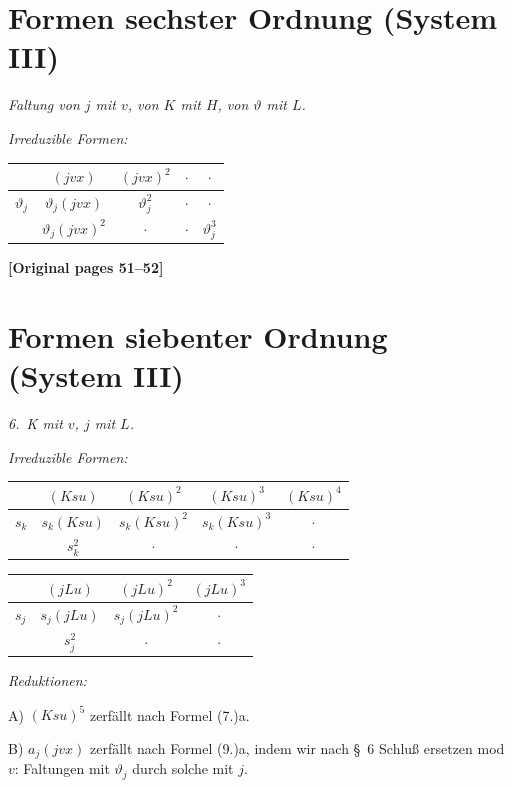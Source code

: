 \documentclass[12pt,a4paper]{article}
\begin{document}
\section{Formen sechster Ordnung (System III)}

\textit{Faltung von $j$ mit $v$, von $K$ mit $H$, von $\vartheta$ mit $L$.}

\textit{Irreduzible Formen:}
\begin{center}
\begin{tabular}{c|cccc}
& $(jvx)$ & $(jvx)^2$ & $\cdot$ & $\cdot$ \\
\hline
$\vartheta_j$ & $\vartheta_j (jvx)$ & $\vartheta_j^2$ & $\cdot$ & $\cdot$ \\
& $\vartheta_j (jvx)^2$ & $\cdot$ & $\cdot$ & $\vartheta_j^3$
\end{tabular}
\end{center}

\noindent\textbf{[Original pages 51--52]}

\section{Formen siebenter Ordnung (System III)}

\textit{6.\ K mit $v$, $j$ mit $L$.}

\textit{Irreduzible Formen:}
\begin{center}
\begin{tabular}{c|cccc}
& $(Ksu)$ & $(Ksu)^2$ & $(Ksu)^3$ & $(Ksu)^4$ \\
\hline
$s_k$ & $s_k(Ksu)$ & $s_k(Ksu)^2$ & $s_k(Ksu)^3$ & $\cdot$ \\
& $s_k^2$ & $\cdot$ & $\cdot$ & $\cdot$
\end{tabular}
\end{center}

\begin{center}
\begin{tabular}{c|ccc}
& $(jLu)$ & $(jLu)^2$ & $(jLu)^3$ \\
\hline
$s_j$ & $s_j(jLu)$ & $s_j(jLu)^2$ & $\cdot$ \\
& $s_j^2$ & $\cdot$ & $\cdot$
\end{tabular}
\end{center}

\textit{Reduktionen:}

A) $(Ksu)^5$ zerfällt nach Formel (7.)a.

B) $a_j(jvx)$ zerfällt nach Formel (9.)a, indem wir nach \S\ 6 Schluß ersetzen mod $v$: Faltungen mit $\vartheta_j$ durch solche mit $j$.
\end{document}
